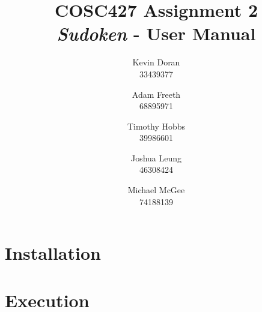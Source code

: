 \documentclass[a4paper, 11pt]{article}
\title{\textbf{COSC427 Assignment 2} \\ {\textit{Sudoken} - User Manual}}
\author{
	Kevin Doran    \\ 33439377 \and
	Adam Freeth    \\ 68895971 \and
	Timothy Hobbs  \\ 39986601 \and
	Joshua Leung   \\ 46308424 \and
	Michael McGee  \\ 74188139
}
\begin{document}
\maketitle




\section{Installation}


\section{Execution}

\end{document}
